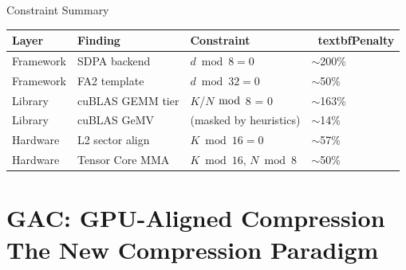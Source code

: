 \documentclass[aspectratio=169,10pt]{beamer}
\begin{document}
\begin{frame}{Constraint Summary}
\begin{table}
\centering
\small
\begin{tabular}{@{}llll@{}}
\toprule
\textbf{Layer} & \textbf{Finding} & \textbf{Constraint} & \
textbf{Penalty} \\
\midrule
\rowcolor{cblue!8} Framework & SDPA backend & $d \bmod 8 = 0$ & $\sim$200\% \\
\rowcolor{cblue!8} Framework & FA2 template & $d \bmod 32 = 0$ & $\sim$50\% \\
\midrule
\rowcolor{corange!8} Library & cuBLAS GEMM tier & $K$/$N$ $\bmod$ 8 = 0 & $\sim$163\% \\
\rowcolor{corange!8} Library & cuBLAS GeMV & (masked by heuristics) & $\sim$14\% \\
\midrule
\rowcolor{cred!8} Hardware & L2 sector align & $K \bmod 16 = 0$ & $\sim$57\% \\
\rowcolor{cred!8} Hardware & Tensor Core MMA & $K \bmod 16$, $N \bmod 8$ & $\sim$50\% \\
\bottomrule
\end{tabular}
\end{table}

\vspace{0.2cm}

\end{frame}


\section{GAC: GPU-Aligned Compression \\ The New Compression Paradigm}
\end{document}
